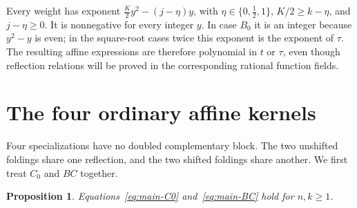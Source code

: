 \documentclass[12pt]{article}
\newtheorem{proposition}[theorem]{Proposition}
\numberwithin{equation}{section}
\begin{document}
Every weight has exponent
$\frac K2y^2-(j-\eta)y$, with
$\eta\in\{0,\tfrac12,1\}$,
$K/2\ge k-\eta$, and $j-\eta\ge0$.
It is nonnegative for every integer $y$.  In case $B_0$ it is an
integer because $y^2-y$ is even; in the square-root cases twice this
exponent is the exponent of $\tau$.  The resulting affine expressions
are therefore polynomial in $t$ or $\tau$, even though reflection
relations will be proved in the corresponding rational function fields.


\section{The four ordinary affine kernels}\label{sec:ordinary}

Four specializations have no doubled complementary block.  The two
unshifted foldings share one reflection, and the two shifted foldings
share another.
We first treat $C_0$ and $BC$ together.

\begin{proposition}
Equations~\eqref{eq:main-C0} and~\eqref{eq:main-BC} hold for $n,k\ge1$.
\end{proposition}
\end{document}
